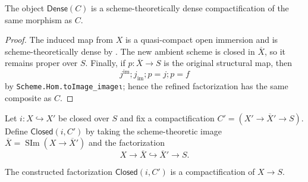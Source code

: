 \begin{proposition}
  \label{prop:nagata-dense-refinement}
  \leanok

  The object $\mathsf{Dense}(C)$ is a scheme-theoretically dense
  compactification of the same morphism as $C$.
\end{proposition}

\begin{proof}
  \leanok
  The induced map from $X$ is a quasi-compact open immersion and is
  scheme-theoretically dense by
  .  The new ambient scheme
  is closed in $\overline X$, so it remains proper over $S$.  Finally, if
  $p\colon\overline X\to S$ is the original structural map, then
  \[
    j^{\mathrm{im}};j_{\mathrm{im}};p
      =j;p=f
  \]
  by \texttt{Scheme.Hom.toImage\_imageι}; hence the refined factorization has
  the same composite as $C$.
\end{proof}

\begin{definition}
  \label{def:nagata-closed-subscheme-compactification}
  \leanok

  Let $i\colon X\hookrightarrow X'$ be closed over $S$ and fix a
  compactification $C'=(X'\to\overline X'\to S)$.  Define
  $\mathsf{Closed}(i,C')$ by taking the scheme-theoretic image
  $\overline X=\operatorname{SIm}(X\to\overline X')$ and the factorization
  \[
    X\longrightarrow\overline X\hookrightarrow\overline X'\longrightarrow S.
  \]
\end{definition}

\begin{proposition}
  \label{prop:nagata-closed-subscheme-compactifiable}
  \leanok

  The constructed factorization $\mathsf{Closed}(i,C')$ is a compactification
  of $X\to S$.
\end{proposition}

